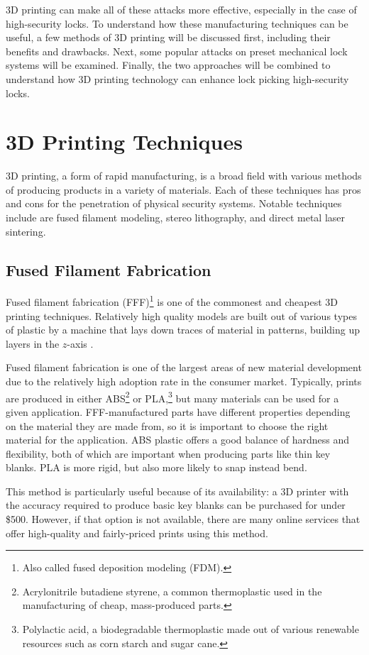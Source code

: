 \documentclass{acm_proc_article-sp}
\begin{document}
3D printing can make all of these attacks more effective, especially in the case of high-security locks. To understand how these manufacturing techniques can be useful, a few methods of 3D printing will be discussed first, including their benefits and drawbacks. Next, some popular attacks on preset mechanical lock systems will be examined. Finally, the two approaches will be combined to understand how 3D printing technology can enhance lock picking high-security locks.

\section{3D Printing Techniques}
3D printing, a form of rapid manufacturing, is a broad field with various methods of producing products in a variety of materials. Each of these techniques has pros and cons for the penetration of physical security systems. Notable techniques include are fused filament modeling, stereo lithography, and direct metal laser sintering.

\subsection{Fused Filament Fabrication}
Fused filament fabrication (FFF)\footnote{Also called fused deposition modeling (FDM).} is one of the commonest and cheapest 3D printing techniques. Relatively high quality models are built out of various types of plastic by a machine that lays down traces of material in patterns, building up layers in the $z$-axis \cite{VALAVAARA}.

Fused filament fabrication is one of the largest areas of new material development due to the relatively high adoption rate in the consumer market. Typically, prints are produced in either ABS\footnote{Acrylonitrile butadiene styrene, a common thermoplastic used in the manufacturing of cheap, mass-produced parts.} or PLA,\footnote{Polylactic acid, a biodegradable thermoplastic made out of various renewable resources such as corn starch and sugar cane.} but many materials can be used for a given application. FFF-manufactured parts have different properties depending on the material they are made from, so it is important to choose the right material for the application. ABS plastic offers a good balance of hardness and flexibility, both of which are important when producing parts like thin key blanks. PLA is more rigid, but also more likely to snap instead bend.

This method is particularly useful because of its availability: a 3D printer with the accuracy required to produce basic key blanks can be purchased for under \$500. However, if that option is not available, there are many online services that offer high-quality and fairly-priced prints using this method.
\end{document}
